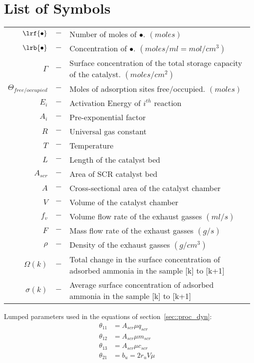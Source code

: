 \section*{List of Symbols}

\begin{table}[H]
    \begin{tabular}{r c l}
        $\lrf{\bullet}$ &$-$& Number of moles of $\bullet$. $(moles)$\\
        $\lrb{\bullet}$ &$-$& Concentration of $\bullet$. $(moles/ml = mol/cm^3)$\\
        $\Gamma$ &$-$& Surface concentration of the total storage capacity of the catalyst. $(moles/cm^2)$\\
        $\Theta_{free/occupied}$ &$-$& Moles of adsorption sites free/occupied. $(moles)$\\
        $E_i$ &$-$& Activation Energy of $i^{th}$ reaction\\
        $A_i$ &$-$& Pre-exponential factor\\
        $R$ &$-$& Universal gas constant\\
        $T$ &$-$& Temperature\\
        $L$ &$-$& Length of the catalyst bed\\
        $A_{scr}$ &$-$& Area of SCR catalyst bed\\
        $A$ &$-$& Cross-sectional area of the catalyst chamber\\
        $V$ &$-$& Volume of the catalyst chamber\\
        $f_v$ &$-$& Volume flow rate of the exhaust gasses $(ml/s)$\\
        $F$ &$-$& Mass flow rate of the exhaust gasses $(g/s)$\\
        $\rho$ &$-$& Density of the exhaust gasses $(g/cm^3)$\\
        $\Omega(k)$ &$-$& Total change in the surface concentration of adsorbed ammonia in the sample [k] to [k+1]\\
        $\sigma(k)$ &$-$& Average surface concentration of adsorbed ammonia in the sample [k] to [k+1]\\
    \end{tabular}
\end{table}

Lumped parameters used in the equations of section~\ref{sec::proc_dyn}:
\begin{align*}
    \theta_{11} &= A_{scr} \mu q_{scr} \\
    \theta_{12} &= A_{scr} \mu m_{scr} \\
     \theta_{13} &= A_{scr} \mu c_{scr} \\
     \theta_{21} &= b_u = 2 r_u V \mu \\
\end{align*}
